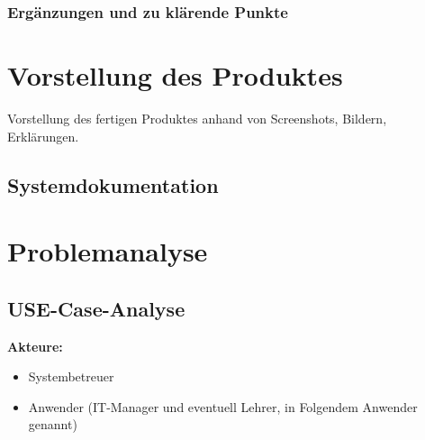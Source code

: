 \subsection{Ergänzungen und zu klärende Punkte}

\chapter{Vorstellung des Produktes}
Vorstellung des fertigen Produktes anhand von Screenshots, Bildern, Erklärungen.


\section{Systemdokumentation}



\chapter{Problemanalyse}

\section{USE-Case-Analyse}
{\linespread{.5}
	\textbf{Akteure:}
	\begin{itemize}
		\item Systembetreuer
		\item Anwender (IT-Manager und eventuell Lehrer, in Folgendem Anwender genannt)
\end{itemize}}

